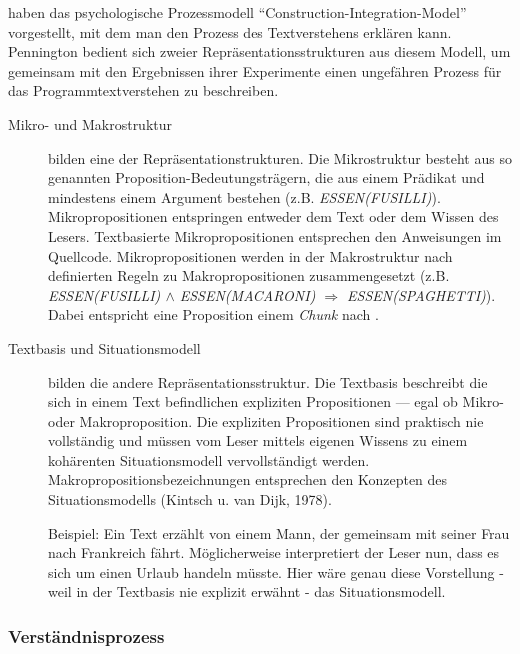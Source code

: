 \cite{Kintsch:1988bz} haben das psychologische Prozessmodell ``Construction-Integration-Model'' vorgestellt, mit dem man den Prozess des Textverstehens erklären kann. Pennington bedient sich zweier Repräsentationsstrukturen aus diesem Modell, um gemeinsam mit den Ergebnissen ihrer Experimente einen ungefähren Prozess für das Programmtextverstehen zu beschreiben.

\begin{description}
\item[Mikro- und Makrostruktur] bilden eine der Repräsentationstrukturen. Die Mikrostruktur besteht aus so genannten Proposition-Bedeutungsträgern, die aus einem Prädikat und mindestens einem Argument bestehen (z.B. \textit{ESSEN(FUSILLI)}). Mikropropositionen entspringen entweder dem Text oder dem Wissen des Lesers. Textbasierte Mikropropositionen entsprechen den Anweisungen im Quellcode. Mikropropositionen werden in der Makrostruktur nach definierten Regeln zu Makropropositionen zusammengesetzt (z.B. \textit{ESSEN(FUSILLI) $\wedge$ ESSEN(MACARONI) $\Rightarrow$ ESSEN(SPAGHETTI)}).
Dabei entspricht eine Proposition einem \textit{Chunk} nach \cite{Miller:1956dz}.
\item[Textbasis und Situationsmodell] bilden die andere Repräsentationsstruktur. Die Textbasis beschreibt die sich in einem Text befindlichen expliziten Propositionen --- egal ob Mikro- oder Makroproposition. Die expliziten Propositionen sind praktisch nie vollständig und müssen vom Leser mittels eigenen Wissens zu einem kohärenten Situationsmodell vervollständigt werden. Makropropositionsbezeichnungen entsprechen den Konzepten des Situationsmodells (Kintsch u. van Dijk, 1978).

Beispiel: Ein Text erzählt von einem Mann, der gemeinsam mit seiner Frau nach Frankreich fährt. Möglicherweise interpretiert der Leser nun, dass es sich um einen Urlaub handeln müsste. Hier wäre genau diese Vorstellung - weil in der Textbasis nie explizit erwähnt - das Situationsmodell. 
\end{description}

\subsubsection{Verständnisprozess}

